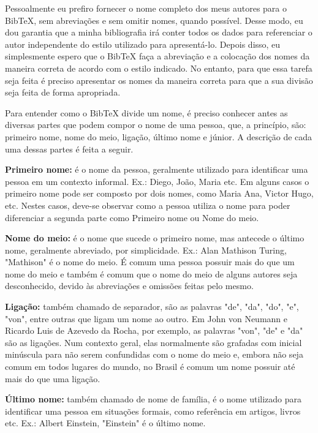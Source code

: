 \begin{anexosenv}
Pessoalmente eu prefiro fornecer o nome completo dos meus autores para o BibTeX, sem abreviações e sem omitir nomes, quando possível. Desse modo, eu dou garantia que a minha bibliografia irá conter todos os dados para referenciar o autor independente do estilo utilizado para apresentá-lo. Depois disso, eu simplesmente espero que o BibTeX faça a abreviação e a colocação dos nomes da maneira correta de acordo com o estilo indicado. No entanto, para que essa tarefa seja feita é preciso apresentar os nomes da maneira correta para que a sua divisão seja feita de forma apropriada.

Para entender como o BibTeX divide um nome, é preciso conhecer antes as diversas partes que podem compor o nome de uma pessoa, que, a princípio, são: primeiro nome, nome do meio, ligação, último nome e júnior. A descrição de cada uma dessas partes é feita a seguir.

\begin{compactitem}
    \item \textbf{Primeiro nome:} é o nome da pessoa, geralmente utilizado para identificar uma pessoa em um contexto informal. Ex.: Diego, João, Maria etc. Em alguns casos o primeiro nome pode ser composto por dois nomes, como Maria Ana, Victor Hugo, etc. Nestes casos, deve-se observar como a pessoa utiliza o nome para poder diferenciar a segunda parte como Primeiro nome ou Nome do meio.

    \item \textbf{Nome do meio:} é o nome que sucede o primeiro nome, mas antecede o último nome, geralmente abreviado, por simplicidade. Ex.: Alan Mathison Turing, "Mathison"{} é o nome do meio. É comum uma pessoa possuir mais do que um nome do meio e também é comum que o nome do meio de alguns autores seja desconhecido, devido às abreviações e omissões feitas pelo mesmo.

    \item \textbf{Ligação:} também chamado de separador, são as palavras "de"{}, "da"{}, "do"{}, "e"{}, "von"{}, entre outras que ligam um nome ao outro. Em John von Neumann e Ricardo Luis de Azevedo da Rocha, por exemplo, as palavras "von"{}, "de"{}  e "da"{}  são as ligações. Num contexto geral, elas normalmente são grafadas com inicial minúscula para não serem confundidas com o nome do meio e, embora não seja comum em todos lugares do mundo, no Brasil é comum um nome possuir até mais do que uma ligação.

    \item \textbf{Último nome:} também chamado de nome de família, é o nome utilizado para identificar uma pessoa em situações formais, como referência em artigos, livros etc. Ex.: Albert Einstein, "Einstein"{} é o último nome.


\end{compactitem}
\end{anexosenv}
